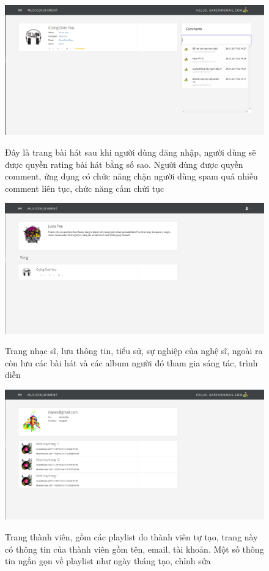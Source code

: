 \documentclass[12pt,a4paper,oneside,openright]{article}
\numberwithin{subsection}{section}
\theoremstyle{definition}
\theoremstyle{plain}
\theoremstyle{definition}
\theoremstyle{definition}
\theoremstyle{remark}
\theoremstyle{definition}
\begin{document}
\begin{figure}[h!]
  \caption{Đây là trang bài hát sau khi người dùng đăng nhập, người dùng sẽ được quyền rating bài hát bằng số sao. Người dùng được quyền comment, ứng dụng có chức năng chặn người dùng spam quá nhiều comment liên tục, chức năng cấm chửi tục}
  \includegraphics[width=\textwidth]{nhac-login.png}
  \label{fg:nhac_login}
\end{figure}


\begin{figure}[h!]
  \caption{Trang nhạc sĩ, lưu thông tin, tiểu sử, sự nghiệp của nghệ sĩ, ngoài ra còn lưu các bài hát và các album người đó tham gia sáng tác, trình diễn}
  \includegraphics[width=\textwidth]{nghesi.png}
  \label{fg:nghesi}
\end{figure}


\begin{figure}[h!]
  \caption{Trang thành viên, gồm các playlist do thành viên tự tạo, trang này có thông tin của thành viên gồm tên, email, tài khoản. Một số thông tin ngắn gọn về playlist như ngày tháng tạo, chỉnh sửa }
  \includegraphics[width=\textwidth]{thanh-vien.png}
  \label{fg:thanh_vien}
\end{figure}
\end{document}
